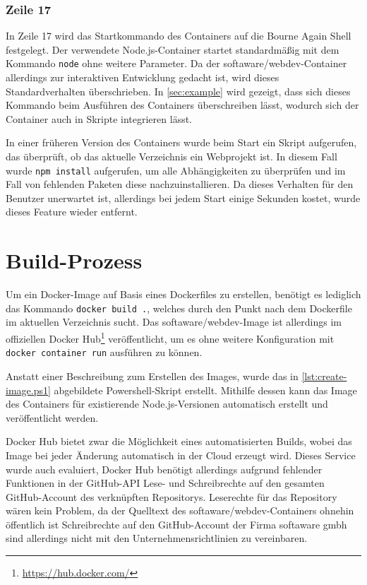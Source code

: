 \subsubsection {Zeile 17}
In Zeile 17 wird das Startkommando des Containers auf die Bourne Again Shell festgelegt.
Der verwendete Node.js-Container startet standardmäßig mit dem Kommando \verb|node| ohne weitere Parameter.
Da der softaware/webdev-Container allerdings zur interaktiven Entwicklung gedacht ist, wird dieses Standardverhalten überschrieben.
In \cref{sec:example} wird gezeigt, dass sich dieses Kommando beim Ausführen des Containers überschreiben lässt, wodurch sich der Container auch in Skripte integrieren lässt.

In einer früheren Version des Containers wurde beim Start ein Skript aufgerufen, das überprüft, ob das aktuelle Verzeichnis ein Webprojekt ist.
In diesem Fall wurde \verb|npm install| aufgerufen, um alle Abhängigkeiten zu überprüfen und im Fall von fehlenden Paketen diese nachzuinstallieren.
Da dieses Verhalten für den Benutzer unerwartet ist, allerdings bei jedem Start einige Sekunden kostet, wurde dieses Feature wieder entfernt. 


\section{Build-Prozess}
\label{sec:build-process}
Um ein Docker-Image auf Basis eines Dockerfiles zu erstellen, benötigt es lediglich das Kommando \verb|docker build .|, welches durch den Punkt nach dem Dockerfile im aktuellen Verzeichnis sucht.
Das softaware/webdev-Image ist allerdings im offiziellen Docker Hub\footnote{\url{https://hub.docker.com/}} veröffentlicht, um es ohne weitere Konfiguration mit \verb|docker container run| ausführen zu können.

Anstatt einer Beschreibung zum Erstellen des Images, wurde das in \cref{lst:create-image.ps1} abgebildete Powershell-Skript erstellt.
Mithilfe dessen kann das Image des Containers für existierende Node.js-Versionen automatisch erstellt und veröffentlicht werden.

Docker Hub bietet zwar die Möglichkeit eines automatisierten Builds, wobei das Image bei jeder Änderung automatisch in der Cloud erzeugt wird.
Dieses Service wurde auch evaluiert, Docker Hub benötigt allerdings aufgrund fehlender Funktionen in der GitHub-API Lese- und Schreibrechte auf den gesamten GitHub-Account des verknüpften Repositorys.
Leserechte für das Repository wären kein Problem, da der Quelltext des softaware/webdev-Containers ohnehin öffentlich ist Schreibrechte auf den GitHub-Account der Firma softaware gmbh sind allerdings nicht mit den Unternehmensrichtlinien zu vereinbaren.

